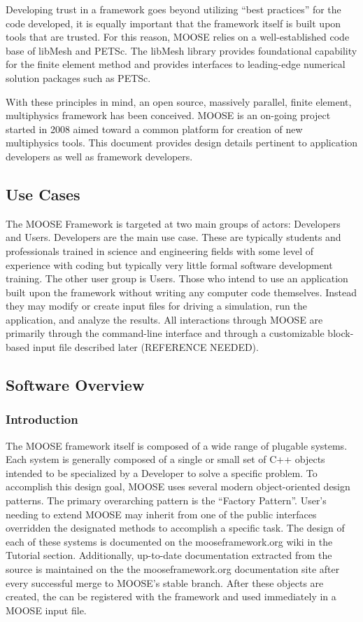 \documentclass{INLreport}
\begin{document}
Developing trust in a framework goes beyond utilizing ``best practices'' for the code developed, it is equally
important that the framework itself is built upon tools that are trusted. For this reason, MOOSE relies on a
well-established code base of libMesh and PETSc.
The libMesh library provides foundational capability for the finite element method and provides interfaces to
leading-edge numerical solution packages such as PETSc.

With these principles in mind, an open source, massively parallel, finite element, multiphysics framework has been conceived.
MOOSE is an on-going project started in 2008 aimed toward a common platform for creation of new multiphysics tools.
This document provides design details pertinent to application developers as well as framework developers.

\subsection{Use Cases}
The MOOSE Framework is targeted at two main groups of actors: Developers and Users. Developers are the main
use case. These are typically students and professionals trained in science and engineering fields with some
level of experience with coding but typically very little formal software development training. The other user
group is Users. Those who intend to use an application built upon the framework without writing any computer
code themselves. Instead they may modify or create input files for driving a simulation, run the application, and
analyze the results. All interactions through MOOSE are primarily through the command-line interface and through
a customizable block-based input file described later (REFERENCE NEEDED).

\subsection{Software Overview}

\subsubsection{Introduction}
The MOOSE framework itself is composed of a wide range of plugable systems. Each system is generally composed of a single or small set of C++ objects intended to be specialized by a Developer to solve a specific problem. To accomplish this design goal, MOOSE uses several modern object-oriented design patterns. The primary overarching pattern is the ``Factory Pattern''. User's needing to extend MOOSE may inherit from one of the public interfaces overridden the designated methods to accomplish a specific task. The design of each of these systems is documented on the mooseframework.org wiki in the Tutorial section. Additionally, up-to-date documentation extracted from the source is maintained on the the mooseframework.org documentation site after every successful merge to MOOSE's stable branch. After these objects are created, the can be registered with the framework and used immediately in a MOOSE input file.
\end{document}
